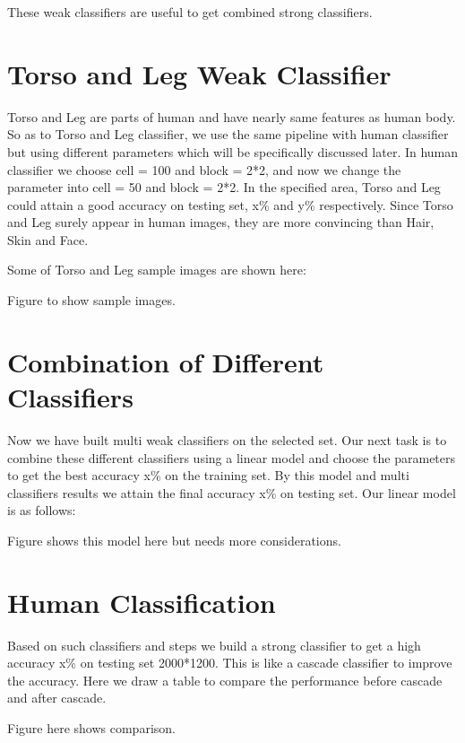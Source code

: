\documentclass[10pt,twocolumn,letterpaper]{article}
\begin{document}
These weak classifiers are useful to get combined strong classifiers.

\section{Torso and Leg Weak Classifier}
Torso and Leg are parts of human and have nearly same features as human body. So as to Torso and Leg classifier, we use the same pipeline with human classifier but using different parameters which will be specifically discussed later. In human classifier we choose cell = 100 and block = 2*2, and now we change the parameter into cell = 50 and block = 2*2.
In the specified area, Torso and Leg could attain a good accuracy on testing set, x\% and y\% respectively.  
Since Torso and Leg surely appear in human images, they are more convincing than Hair, Skin and Face. 

Some of Torso and Leg sample images are shown here:

Figure to show sample images.

\section{Combination of Different Classifiers}
Now we have built multi weak classifiers on the selected set. Our next task is to combine these different classifiers using a linear model and choose the parameters to get the best accuracy x\% on the training set. By this model and multi classifiers results we attain the final accuracy x\% on testing set. Our linear model is as follows: 

Figure shows this model here but needs more considerations.

\section{Human Classification}
Based on such classifiers and steps we build a strong classifier to get a high accuracy x\% on testing set 2000*1200. This is like a cascade classifier to improve the accuracy. Here we draw a table to compare the performance before cascade and after cascade.

Figure here shows comparison. 

\end{document}
